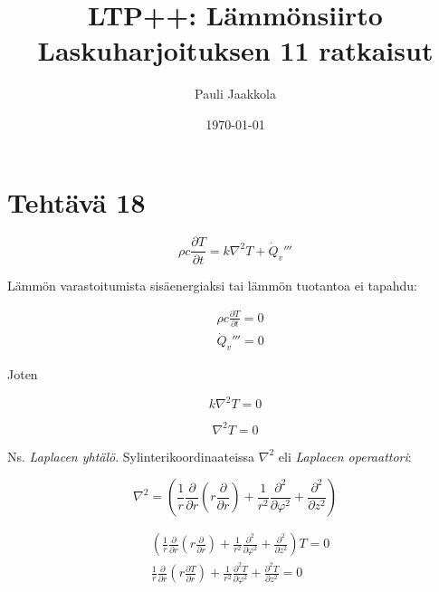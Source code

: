 \documentclass[12pt,a4paper,finnish]{article}
\title{LTP++: Lämmönsiirto\\Laskuharjoituksen 11 ratkaisut}
\date{\today}
\author{Pauli Jaakkola}
\begin{document}
\maketitle
\tableofcontents
\newpage

\section{Tehtävä 18}

\begin{framed}
 \begin{equation}
   \rho c\frac{\partial T}{\partial t} = k\nabla^2T + \dot{Q}_v'''
 \end{equation}
\end{framed}

Lämmön varastoitumista sisäenergiaksi tai lämmön tuotantoa ei tapahdu:

\begin{align}
 &\rho c\frac{\partial T}{\partial t} = 0\\
 &\dot{Q}_v''' = 0
\end{align}

Joten

\begin{equation}
  k\nabla^2T = 0
\end{equation}

\begin{framed}
 \begin{equation}
   \nabla^2T = 0
 \end{equation}
\end{framed}

Ns. \textit{Laplacen yhtälö}. Sylinterikoordinaateissa $\nabla^2$ eli \textit{Laplacen operaattori}:

\begin{equation}
 \nabla^2 = \left(\frac{1}{r}\frac{\partial}{\partial r}\left(r\frac{\partial}{\partial r}\right)
   + \frac{1}{r^2}\frac{\partial^2}{\partial \varphi^2} + \frac{\partial^2}{\partial z^2}\right)
\end{equation}

\begin{align}
 &\left(\frac{1}{r}\frac{\partial}{\partial r}\left(r\frac{\partial}{\partial r}\right)
   + \frac{1}{r^2}\frac{\partial^2}{\partial \varphi^2} + \frac{\partial^2}{\partial z^2}\right)T = 0\\
 &\frac{1}{r}\frac{\partial}{\partial r}\left(r\frac{\partial T}{\partial r}\right)
   + \frac{1}{r^2}\frac{\partial^2T}{\partial \varphi^2} + \frac{\partial^2T}{\partial z^2} = 0
\end{align}
\end{document}

